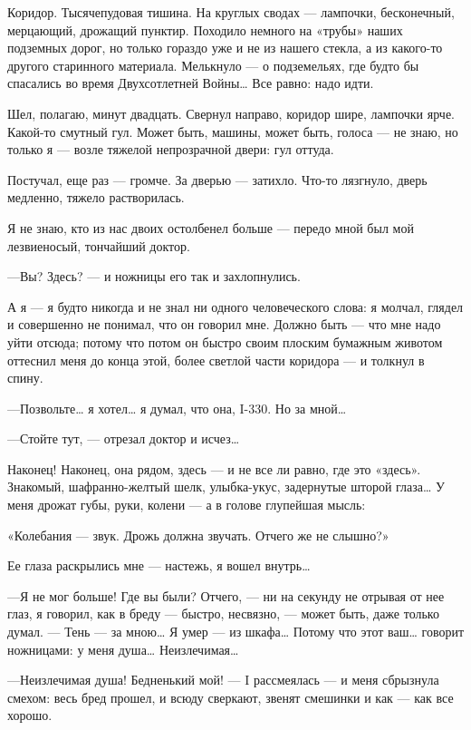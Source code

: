 \documentclass[11pt,openany]{book}
\begin{document}
Коридор. Тысячепудовая тишина. На круглых сводах --- лампочки, бесконечный, мерцающий, дрожащий пунктир. Походило немного на «трубы» наших подземных дорог, но только гораздо уже и не из нашего стекла, а из какого-то другого старинного материала. Мелькнуло --- о подземельях, где будто бы спасались во время Двухсотлетней Войны\ldots{} Все равно: надо идти.

Шел, полагаю, минут двадцать. Свернул направо, коридор шире, лампочки ярче. Какой-то смутный гул. Может быть, машины, может быть, голоса --- не знаю, но только я --- возле тяжелой непрозрачной двери: гул оттуда.

Постучал, еще раз --- громче. За дверью --- затихло. Что-то лязгнуло, дверь медленно, тяжело растворилась.

Я не знаю, кто из нас двоих остолбенел больше --- передо мной был мой лезвиеносый, тончайший доктор.

---Вы? Здесь? --- и ножницы его так и захлопнулись.

А я --- я будто никогда и не знал ни одного человеческого слова: я молчал, глядел и совершенно не понимал, что он говорил мне. Должно быть --- что мне надо уйти отсюда; потому что потом он быстро своим плоским бумажным животом оттеснил меня до конца этой, более светлой части коридора --- и толкнул в спину.

---Позвольте\ldots{} я хотел\ldots{} я думал, что она, I-330. Но за мной\ldots{}

---Стойте тут, --- отрезал доктор и исчез\ldots{}

Наконец! Наконец, она рядом, здесь --- и не все ли равно, где это «здесь». Знакомый, шафранно-желтый шелк, улыбка-укус, задернутые шторой глаза\ldots{} У меня дрожат губы, руки, колени --- а в голове глупейшая мысль:

«Колебания --- звук. Дрожь должна звучать. Отчего же не слышно?»

Ее глаза раскрылись мне --- настежь, я вошел внутрь\ldots{}

---Я не мог больше! Где вы были? Отчего, --- ни на секунду не отрывая от нее глаз, я говорил, как в бреду --- быстро, несвязно, --- может быть, даже только думал. --- Тень --- за мною\ldots{} Я умер --- из шкафа\ldots{} Потому что этот ваш\ldots{} говорит ножницами: у меня душа\ldots{} Неизлечимая\ldots{}

---Неизлечимая душа! Бедненький мой! --- I рассмеялась --- и меня сбрызнула смехом: весь бред прошел, и всюду сверкают, звенят смешинки и как --- как все хорошо.
\end{document}
